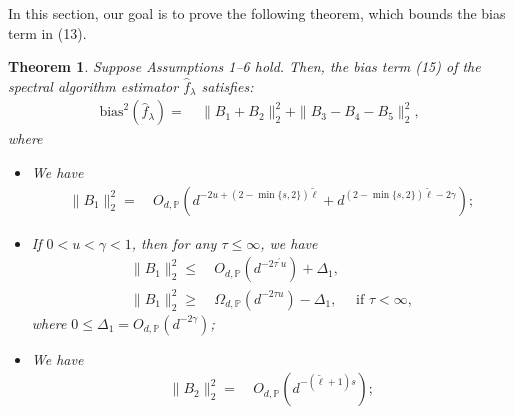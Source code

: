 \documentclass{article}
\theoremstyle{plain}
\newtheorem{theorem}{Theorem}[section]
\theoremstyle{definition}
\theoremstyle{remark}
\newcommand{\green}{\color{green}}
\newcommand{\dhnote}[1]{{\color{red}[#1]} } %
\begin{document}
\begin{appendix}
    



In this section, our goal is to prove the following theorem, which bounds the bias term in (13).


\begin{theorem}\label{thm_bias_spe}
Suppose Assumptions 1--6 hold.
Then, the bias term (15) of the spectral algorithm estimator $\hat{f}_{\lambda}$ satisfies:
    \begin{equation*}
\begin{aligned}
    \mathrm{bias}^{2}(\hat{f}_{\lambda})  =  &~
    \|B_1+B_2\|_{2}^{2} + \|B_3-B_4-B_5\|_{2}^{2},
\end{aligned} 
\end{equation*}
where
\begin{itemize}

\item[(i)] We have
    \begin{equation*}
    \begin{aligned}
                \|B_1\|_{2}^{2}  =&~ 
                O_{d, \mathbb{P}}\left(d^{-2u + (2-\min\{s, 2\})\tilde{\ell} } + d^{(2-\min\{s, 2\})\tilde{\ell}-2\gamma }\right);
    \end{aligned}
\end{equation*}

    \item[(ii)]
    If $0 < u < \gamma <1$, then for any $\tau \leq \infty$, we have
        \begin{equation*}
        \begin{aligned}
                \|B_1\|_{2}^{2}  \leq &~ 
                O_{d, \mathbb{P}}\left(  d^{-2\tau^{\prime} u} \right) + \Delta_1,\\
                \|B_1\|_{2}^{2}  \geq &~ 
                \Omega_{d, \mathbb{P}}\left(  d^{-2\tau u} \right)- \Delta_1, \quad \text{ if } \tau<\infty,
        \end{aligned}
        \end{equation*}
        where $0 \leq \Delta_1 = O_{d, \mathbb{P}}\left( d^{-2\gamma }\right)$;

\item[(iii)] We have
\begin{equation*}
    \begin{aligned}
                \|B_2\|_{2}^{2} =&~ 
            O_{d, \mathbb{P}}\left(  d^{-(\tilde{\ell}+1)s}\right);
    \end{aligned}
\end{equation*}


\end{itemize}
\end{theorem}
\end{appendix}
\end{document}
